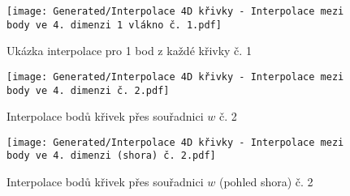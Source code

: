 \begin{imagepage}
    \begin{figure}[H]
        \centering
        \texttt{[image: Generated/Interpolace 4D křivky - Interpolace mezi body ve 4. dimenzi 1 vlákno č. 1.pdf]}
        \caption{Ukázka interpolace pro 1 bod z každé křivky č. 1}
        \label{fig:Demo 4D Interpolace mezi body přes souřadnici w konst x 1}
    \end{figure}
\end{imagepage}
\begin{imagepage}
    \begin{figure}[H]
        \centering
        \texttt{[image: Generated/Interpolace 4D křivky - Interpolace mezi body ve 4. dimenzi č. 2.pdf]}
        \caption{Interpolace bodů křivek přes souřadnici $w$ č. 2}
        \label{fig:Demo 4D Interpolace mezi body přes souřadnici w 2}
    \end{figure}
    \begin{figure}[H]
        \centering
        \texttt{[image: Generated/Interpolace 4D křivky - Interpolace mezi body ve 4. dimenzi (shora) č. 2.pdf]}
        \caption{Interpolace bodů křivek přes souřadnici $w$ (pohled shora) č. 2}
        \label{fig:Demo 4D Interpolace mezi body přes souřadnici w shora 2}
    \end{figure}
\end{imagepage}

